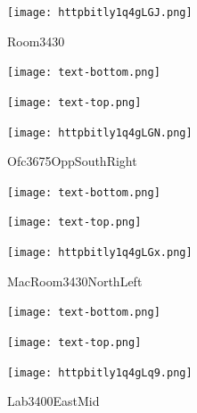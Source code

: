 \documentclass[letterpaper]{article}
\begin{document}
 \begingroup 
 \centerline{\texttt{[image: httpbitly1q4gLGJ.png]}} 
 \endgroup 
 \vspace*{\fill} 

 \hfill{\small Room3430} 

  \vspace{0.7in} 
 
 \centerline{\texttt{[image: text-bottom.png]}} 
 
 \pagebreak 
{} 
 \vspace*{\fill} 
 
  \centerline{\texttt{[image: text-top.png]}} 
 
 \vspace{0.5in} 
 
 \begingroup 
 \centerline{\texttt{[image: httpbitly1q4gLGN.png]}} 
 \endgroup 
 \vspace*{\fill} 

 \hfill{\small Ofc3675OppSouthRight} 

  \vspace{0.7in} 
 
 \centerline{\texttt{[image: text-bottom.png]}} 
 
 \pagebreak 
{} 
 \vspace*{\fill} 
 
  \centerline{\texttt{[image: text-top.png]}} 
 
 \vspace{0.5in} 
 
 \begingroup 
 \centerline{\texttt{[image: httpbitly1q4gLGx.png]}} 
 \endgroup 
 \vspace*{\fill} 

 \hfill{\small MacRoom3430NorthLeft} 

  \vspace{0.7in} 
 
 \centerline{\texttt{[image: text-bottom.png]}} 
 
 \pagebreak 
{} 
 \vspace*{\fill} 
 
  \centerline{\texttt{[image: text-top.png]}} 
 
 \vspace{0.5in} 
 
 \begingroup 
 \centerline{\texttt{[image: httpbitly1q4gLq9.png]}} 
 \endgroup 
 \vspace*{\fill} 

 \hfill{\small Lab3400EastMid} 

  \vspace{0.7in} 
 
\end{document}

